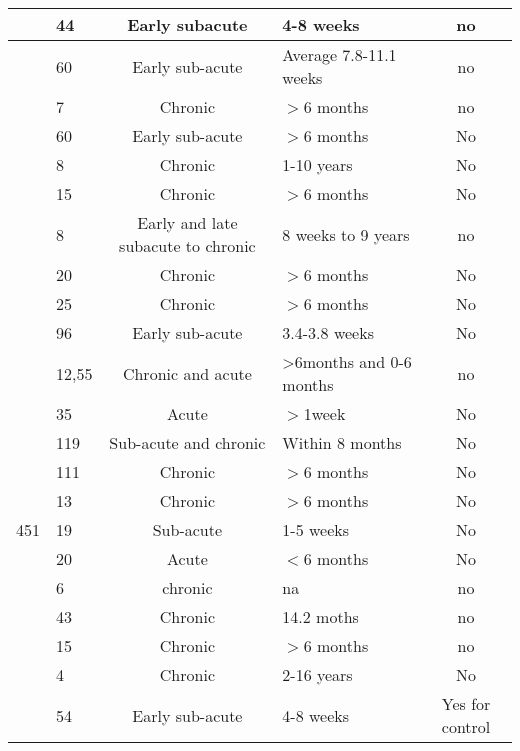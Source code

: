 \begin{longtable}{|p{3cm}||p{2cm}|c|p{3cm}|c|}
	\hline
	\cite{Hesse2006} & 44 & Early subacute & 4-8 weeks & no \bigstrut\\
	\hline
	\cite{VanDelden2012} & 60 & Early sub-acute & Average 7.8-11.1 weeks & no \bigstrut\\
	\hline
	\cite{Johnson2011b} & 7  & Chronic & $>$6 months & no \bigstrut\\
	\hline
	\cite{VanDelden2009} & 60 & Early sub-acute & $>$6 months & No \bigstrut\\
	\hline
	\cite{Johnson2005} & 8  & Chronic & 1-10 years & No \bigstrut\\
	\hline
	\cite{Richards2008} & 15 & Chronic & $>$6 months & No \bigstrut\\
	\hline
	\cite{Toth2006} & 8  & Early and late subacute to chronic & 8 weeks to  9 years & no \bigstrut\\
	\hline
	\cite{Liao2012} & 20 & Chronic & $>$6 months & No \bigstrut\\
	\hline
	\cite{Kim2013} & 25 & Chronic & $>$6 months & No \bigstrut\\
	\hline
	\cite{Hesse2011} & 96 & Early sub-acute & 3.4-3.8 weeks & No \bigstrut\\
	\hline
	\cite{Schmidt2004}& 12,55 & Chronic and acute & >6months and 0-6 months & no \bigstrut\\
	\hline
	\cite{Masiero2007}& 35 & Acute & $>$1week & No \bigstrut\\
	\hline
	\cite{Buschfort2010} & 119 & Sub-acute and chronic & Within 8 months & No \bigstrut\\
	\hline
	\cite{Whitall2011} & 111 & Chronic & $>$6 months & No \bigstrut\\
	\hline
	\cite{Hijmans2011} & 13 & Chronic & $>$6 months & No \bigstrut\\
	\hline
	\cite{Stoykov2010} 451 & 19 & Sub-acute & 1-5 weeks & No \bigstrut\\
	\hline
	\cite{Chang2007}  & 20 & Acute & $<$6 months & No \bigstrut\\
	\hline
	\cite{Diez2018}& 6  & chronic & na & no \bigstrut\\
	\hline
	\cite{Hsu2019} & 43 & Chronic & 14.2 moths & no \bigstrut\\
	\hline
	\cite{Simkins2016} & 15 & Chronic & $>$6 months & no \bigstrut\\
	\hline
	\cite{Reinkensmeyer1999}& 4  & Chronic & 2-16 years & No \bigstrut\\
	\hline
	\cite{Hesse2008} & 54 & Early sub-acute & 4-8 weeks & Yes for control \bigstrut\\

\end{longtable}

